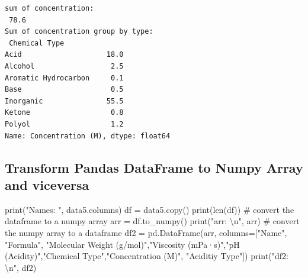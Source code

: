 \documentclass[
  letterpaper,
  DIV=11,
  numbers=noendperiod]{scrreprt}
\newenvironment{Shaded}{\begin{snugshade}}{\end{snugshade}}
\newcommand{\BuiltInTok}[1]{\textcolor[rgb]{0.00,0.23,0.31}{#1}}
\newcommand{\CharTok}[1]{\textcolor[rgb]{0.13,0.47,0.30}{#1}}
\newcommand{\CommentTok}[1]{\textcolor[rgb]{0.37,0.37,0.37}{#1}}
\newcommand{\NormalTok}[1]{\textcolor[rgb]{0.00,0.23,0.31}{#1}}
\newcommand{\OperatorTok}[1]{\textcolor[rgb]{0.37,0.37,0.37}{#1}}
\newcommand{\StringTok}[1]{\textcolor[rgb]{0.13,0.47,0.30}{#1}}
\begin{document}
\begin{verbatim}
sum of concentration: 
 78.6
Sum of concentration group by type: 
 Chemical Type
Acid                    18.0
Alcohol                  2.5
Aromatic Hydrocarbon     0.1
Base                     0.5
Inorganic               55.5
Ketone                   0.8
Polyol                   1.2
Name: Concentration (M), dtype: float64
\end{verbatim}

\subsection*{Transform Pandas DataFrame to Numpy Array and
viceversa}\label{transform-pandas-dataframe-to-numpy-array-and-viceversa}

\begin{Shaded}
\begin{Highlighting}[]
\BuiltInTok{print}\NormalTok{(}\StringTok{"Names: "}\NormalTok{, data5.columns)}
\NormalTok{df }\OperatorTok{=}\NormalTok{ data5.copy()}
\BuiltInTok{print}\NormalTok{(}\BuiltInTok{len}\NormalTok{(df))}
\CommentTok{\# convert the dataframe to a numpy array}
\NormalTok{arr }\OperatorTok{=}\NormalTok{ df.to\_numpy() }
\BuiltInTok{print}\NormalTok{(}\StringTok{"arr: }\CharTok{\textbackslash{}n}\StringTok{"}\NormalTok{, arr)}
\CommentTok{\# convert the numpy array to a dataframe}
\NormalTok{df2 }\OperatorTok{=}\NormalTok{ pd.DataFrame(arr, columns}\OperatorTok{=}\NormalTok{[}\StringTok{"Name"}\NormalTok{, }\StringTok{"Formula"}\NormalTok{, }\StringTok{"Molecular Weight (g/mol)"}\NormalTok{,}\StringTok{"Viscosity (mPa·s)"}\NormalTok{,}\StringTok{"pH (Acidity)"}\NormalTok{,}\StringTok{"Chemical Type"}\NormalTok{,}\StringTok{"Concentration (M)"}\NormalTok{, }\StringTok{"Aciditiy Type"}\NormalTok{])}
\BuiltInTok{print}\NormalTok{(}\StringTok{"df2: }\CharTok{\textbackslash{}n}\StringTok{"}\NormalTok{, df2)}
\end{Highlighting}
\end{Shaded}
\end{document}
